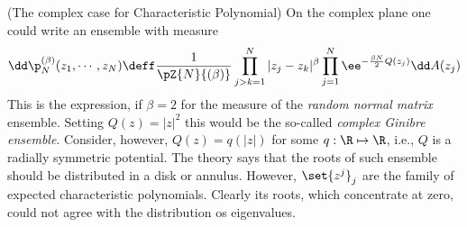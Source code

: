 \begin{exemplo}(The complex case for Characteristic Polynomial)
	On the complex plane one could write an ensemble with measure
	\begin{equation}
		\dd \p_N^{(\beta)} (z_1, \cdots, z_N) \deff \frac{1}{\pZ{N}{(\beta)}} \prod_{j > k = 1}^{N} |z_j - z_k|^\beta \prod_{j=1}^{N} \ee^{- \frac{\beta N}{2} Q(z_j)} \dd A(z_j)
		\label{Equation: Measure Normal Matrix}
	\end{equation}
	This is the expression, if $\beta = 2$ for the measure of the \textit{random normal matrix} ensemble. Setting $Q(z) = |z|^2$ this would be the so-called \textit{complex Ginibre ensemble}. Consider, however, $Q(z) = q(|z|)$ for some $q: \R \mapsto \R$, i.e., $Q$ is a radially symmetric potential. The theory says that the roots of such ensemble should be distributed in a disk or annulus. However, $\set{z^j}_j$ are the family of expected characteristic polynomials. Clearly its roots, which concentrate at zero, could not agree with the distribution os eigenvalues.
\end{exemplo}  


